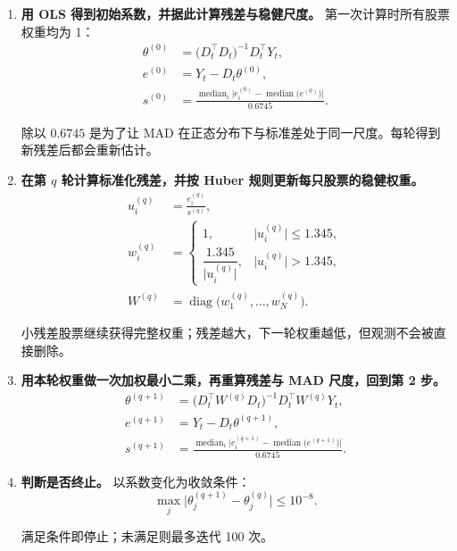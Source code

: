 \documentclass[UTF8,a4paper,11pt]{ctexart}
\begin{document}
\begin{enumerate}[leftmargin=2.2em,itemsep=2pt,topsep=3pt]
\item 
\textbf{用 OLS 得到初始系数，并据此计算残差与稳健尺度。} 第一次计算时所有股票权重均为 1：
\begin{align}
\theta^{(0)} &= \bigl(D_t^{\top} D_t\bigr)^{-1} D_t^{\top} Y_t, \\
e^{(0)} &= Y_t - D_t \theta^{(0)}, \\
s^{(0)} &= \frac{\operatorname{median}_i \bigl\vert e_i^{(0)} - \operatorname{median}\bigl(e^{(0)}\bigr) \bigr\vert}{0.6745}.
\end{align}

除以 $0.6745$ 是为了让 MAD 在正态分布下与标准差处于同一尺度。每轮得到新残差后都会重新估计。

\item 
\textbf{在第 $q$ 轮计算标准化残差，并按 Huber 规则更新每只股票的稳健权重。}
\begin{align}
u_i^{(q)} &= \frac{e_i^{(q)}}{s^{(q)}}, \\
w_i^{(q)} &=
\begin{cases}
1, & \bigl\vert u_i^{(q)} \bigr\vert \le 1.345, \\[6pt]
\dfrac{1.345}{\bigl\vert u_i^{(q)} \bigr\vert}, & \bigl\vert u_i^{(q)} \bigr\vert > 1.345,
\end{cases} \\
W^{(q)} &= \operatorname{diag}\bigl(w_1^{(q)}, \dots, w_N^{(q)}\bigr).
\end{align}

小残差股票继续获得完整权重；残差越大，下一轮权重越低，但观测不会被直接删除。

\item 
\textbf{用本轮权重做一次加权最小二乘，再重算残差与 MAD 尺度，回到第 2 步。}
\begin{align}
\theta^{(q+1)} &= \bigl(D_t^{\top} W^{(q)} D_t\bigr)^{-1} D_t^{\top} W^{(q)} Y_t, \\
e^{(q+1)} &= Y_t - D_t \theta^{(q+1)}, \\
s^{(q+1)} &= \frac{\operatorname{median}_i \bigl\vert e_i^{(q+1)} - \operatorname{median}\bigl(e^{(q+1)}\bigr) \bigr\vert}{0.6745}.
\end{align}


\item 
\textbf{判断是否终止。} 以系数变化为收敛条件：
\begin{equation}
\max_j \bigl\vert \theta_j^{(q+1)} - \theta_j^{(q)} \bigr\vert \le 10^{-8}.
\end{equation}

满足条件即停止；未满足则最多迭代 100 次。

\end{enumerate}
\end{document}
